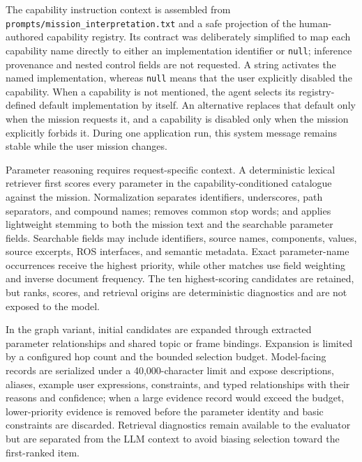 The capability instruction context is assembled from \texttt{prompts/mission\_interpretation.txt} and a safe projection of the human-authored capability registry. Its contract was deliberately simplified to map each capability name directly to either an implementation identifier or \texttt{null}; inference provenance and nested control fields are not requested. A string activates the named implementation, whereas \texttt{null} means that the user explicitly disabled the capability. When a capability is not mentioned, the agent selects its registry-defined default implementation by itself. An alternative replaces that default only when the mission requests it, and a capability is disabled only when the mission explicitly forbids it. During one application run, this system message remains stable while the user mission changes.

Parameter reasoning requires request-specific context. A deterministic lexical retriever first scores every parameter in the capability-conditioned catalogue against the mission. Normalization separates identifiers, underscores, path separators, and compound names; removes common stop words; and applies lightweight stemming to both the mission text and the searchable parameter fields. Searchable fields may include identifiers, source names, components, values, source excerpts, ROS interfaces, and semantic metadata. Exact parameter-name occurrences receive the highest priority, while other matches use field weighting and inverse document frequency. The ten highest-scoring candidates are retained, but ranks, scores, and retrieval origins are deterministic diagnostics and are not exposed to the model.

In the graph variant, initial candidates are expanded through extracted parameter relationships and shared topic or frame bindings. Expansion is limited by a configured hop count and the bounded selection budget. Model-facing records are serialized under a 40,000-character limit and expose descriptions, aliases, example user expressions, constraints, and typed relationships with their reasons and confidence; when a large evidence record would exceed the budget, lower-priority evidence is removed before the parameter identity and basic constraints are discarded. Retrieval diagnostics remain available to the evaluator but are separated from the LLM context to avoid biasing selection toward the first-ranked item.

